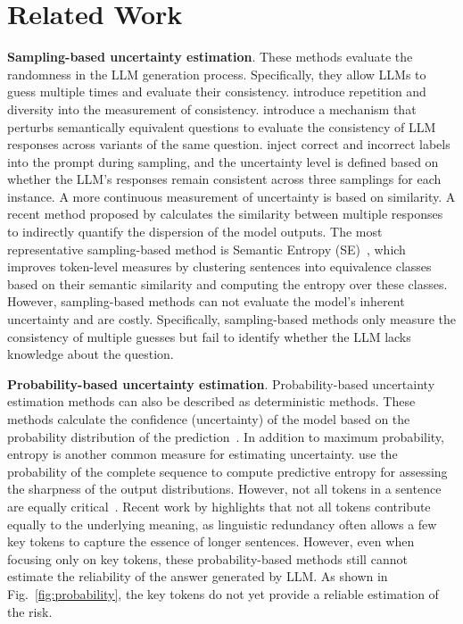 \section{Related Work}

\textbf{Sampling-based uncertainty estimation}.\quad  
These methods evaluate the randomness in the LLM generation process. Specifically, they allow LLMs to guess multiple times and evaluate their consistency. \cite{selectivelyanswering2023} introduce repetition and diversity into the measurement of consistency.
\cite{zhang2024sac3reliable} introduce a mechanism that perturbs semantically equivalent questions to evaluate the consistency of LLM responses across variants of the same question.  
\cite{huang2024uncttp} inject correct and incorrect labels into the prompt during sampling, and the uncertainty level is defined based on whether the LLM's responses remain consistent across three samplings for each instance.  
A more continuous measurement of uncertainty is based on similarity. A recent method proposed by \cite{lin2024generating} calculates the similarity between multiple responses to indirectly quantify the dispersion of the model outputs.  
The most representative sampling-based method is Semantic Entropy (SE)~\cite{kuhn2023semantic}, which improves token-level measures by clustering sentences into equivalence classes based on their semantic similarity and computing the entropy over these classes. However, sampling-based methods can not evaluate the model's inherent uncertainty and are costly. Specifically, sampling-based methods only measure the consistency of multiple guesses but fail to identify whether the LLM lacks knowledge about the question.

\textbf{Probability-based uncertainty estimation}.\quad  
Probability-based uncertainty estimation methods can also be described as deterministic methods. These methods calculate the confidence (uncertainty) of the model based on the probability distribution of the prediction~\cite{arora2021prob2}. In addition to maximum probability, entropy is another common measure for estimating uncertainty. \cite{kadavath2022language} use the probability of the complete sequence to compute predictive entropy for assessing the sharpness of the output distributions. However, not all tokens in a sentence are equally critical~\cite{lin2024critical}. Recent work by \cite{duan2024shifting} highlights that not all tokens contribute equally to the underlying meaning, as linguistic redundancy often allows a few key tokens to capture the essence of longer sentences. However, even when focusing only on key tokens, these probability-based methods still cannot estimate the reliability of the answer generated by LLM. As shown in Fig.~\ref{fig:probability}, the key tokens do not yet provide a reliable estimation of the risk.


